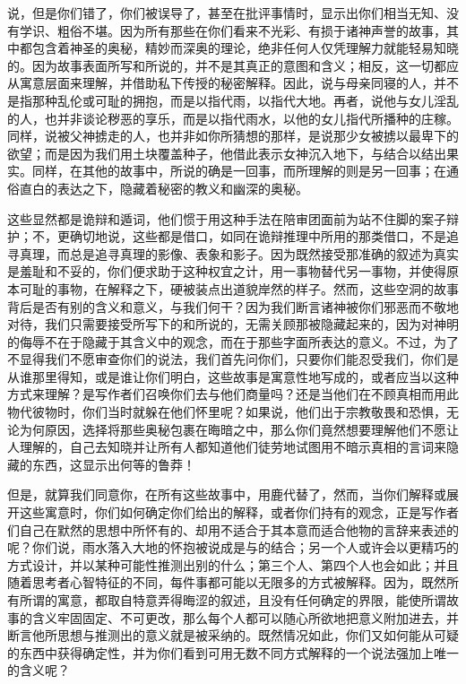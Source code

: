说，但是你们错了，你们被误导了，甚至在批评事情时，显示出你们相当无知、没有学识、粗俗不堪。因为所有那些在你们看来不光彩、有损于诸神声誉的故事，其中都包含着神圣的奥秘，精妙而深奥的理论，绝非任何人仅凭理解力就能轻易知晓的。因为故事表面所写和所说的，并不是其真正的意图和含义；相反，这一切都应从寓意层面来理解，并借助私下传授的秘密解释。因此，说与母亲同寝的人，并不是指那种乱伦或可耻的拥抱，而是以指代雨，以指代大地。再者，说他与女儿淫乱的人，也并非谈论秽恶的享乐，而是以指代雨水，以他的女儿指代所播种的庄稼。同样，说被父神掳走的人，也并非如你所猜想的那样，是说那少女被掳以最卑下的欲望；而是因为我们用土块覆盖种子，他借此表示女神沉入地下，与结合以结出果实。同样，在其他的故事中，所说的确是一回事，而所理解的则是另一回事；在通俗直白的表达之下，隐藏着秘密的教义和幽深的奥秘。\par

这些显然都是诡辩和遁词，他们惯于用这种手法在陪审团面前为站不住脚的案子辩护；不，更确切地说，这些都是借口，如同在诡辩推理中所用的那类借口，不是追寻真理，而总是追寻真理的影像、表象和影子。因为既然接受那准确的叙述为真实是羞耻和不妥的，你们便求助于这种权宜之计，用一事物替代另一事物，并使得原本可耻的事物，在解释之下，硬被装点出道貌岸然的样子。然而，这些空洞的故事背后是否有别的含义和意义，与我们何干？因为我们断言诸神被你们邪恶而不敬地对待，我们只需要接受所写下的和所说的，无需关顾那被隐藏起来的，因为对神明的侮辱不在于隐藏于其含义中的观念，而在于那些字面所表达的意义。不过，为了不显得我们不愿审查你们的说法，我们首先问你们，只要你们能忍受我们，你们是从谁那里得知，或是谁让你们明白，这些故事是寓意性地写成的，或者应当以这种方式来理解？是写作者们召唤你们去与他们商量吗？还是当他们在不顾真相而用此物代彼物时，你们当时就躲在他们怀里呢？如果说，他们出于宗教敬畏和恐惧，无论为何原因，选择将那些奥秘包裹在晦暗之中，那么你们竟然想要理解他们不愿让人理解的，自己去知晓并让所有人都知道他们徒劳地试图用不暗示真相的言词来隐藏的东西，这显示出何等的鲁莽！\par

但是，就算我们同意你，在所有这些故事中，用鹿代替了，然而，当你们解释或展开这些寓意时，你们如何确定你们给出的解释，或者你们持有的观念，正是写作者们自己在默然的思想中所怀有的、却用不适合于其本意而适合他物的言辞来表述的呢？你们说，雨水落入大地的怀抱被说成是与的结合；另一个人或许会以更精巧的方式设计，并以某种可能性推测出别的什么；第三个人、第四个人也会如此；并且随着思考者心智特征的不同，每件事都可能以无限多的方式被解释。因为，既然所有所谓的寓意，都取自特意弄得晦涩的叙述，且没有任何确定的界限，能使所谓故事的含义牢固固定、不可更改，那么每个人都可以随心所欲地把意义附加进去，并断言他所思想与推测出的意义就是被采纳的。既然情况如此，你们又如何能从可疑的东西中获得确定性，并为你们看到可用无数不同方式解释的一个说法强加上唯一的含义呢？\par

